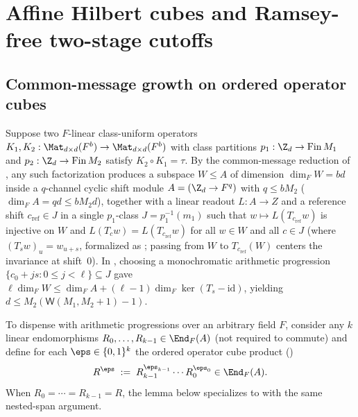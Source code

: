 \section{Affine Hilbert cubes and Ramsey-free two-stage cutoffs}\label{sec:cubes}

\subsection{Common-message growth on ordered operator cubes}\label{sec:cube-lemma}

Suppose two $F$-linear class-uniform operators
$K_1, K_2 : \Mat_{d\times d}(F^b) \to \Mat_{d\times d}(F^b)$ with class partitions
$p_1 : \Z_d \to \mathrm{Fin}\,M_1$ and $p_2 : \Z_d \to \mathrm{Fin}\,M_2$ satisfy
$K_2 \circ K_1 = \tau$. By the common-message reduction of
\cite[Lemma~6.1 and Theorem~6.3]{SharedDecoders2026}, any such factorization produces a subspace
$W \le A$ of dimension $\dim_F W = bd$ inside a $q$-channel cyclic shift module
$A = (\Z_d \to F^q)$ with $q \le b M_2$ ($\dim_F A = qd \le b M_2 d$), together with a linear
readout $L : A \to Z$ and a reference shift $c_{\mathrm{ref}} \in J$ in a single $p_1$-class
$J = p_1^{-1}(m_1)$ such that $w \mapsto L(T_{c_{\mathrm{ref}}} w)$ is injective on $W$ and
$L(T_c w) = L(T_{c_{\mathrm{ref}}} w)$ for all $w \in W$ and all $c \in J$ (where
$(T_s w)_u = w_{u+s}$, formalized as ; passing from $W$ to
$T_{c_{\mathrm{ref}}}(W)$ centers the invariance at shift~$0$). In
\cite[Theorem~6.3]{SharedDecoders2026}, choosing a monochromatic arithmetic progression
$\{c_0 + j s : 0 \le j < \ell\} \subseteq J$ gave
$\ell \dim_F W \le \dim_F A + (\ell - 1)\dim_F\ker(T_s - \mathrm{id})$, yielding
$d \le M_2(\mathsf{W}(M_1, M_2 + 1) - 1)$.

To dispense with arithmetic progressions over an arbitrary field $F$, consider any $k$ linear
endomorphisms $R_0, \dots, R_{k-1} \in \End_F(A)$ (not required to commute) and define for each
$\eps \in \{0,1\}^k$ the ordered operator cube product ()
\[
  R^\eps \;:=\; R_{k-1}^{\eps_{k-1}} \cdots R_0^{\eps_0} \in \End_F(A).
\]
When $R_0 = \cdots = R_{k-1} = R$, the lemma below specializes to \cite[Lemma~6.1]{SharedDecoders2026}
with the same nested-span argument.

